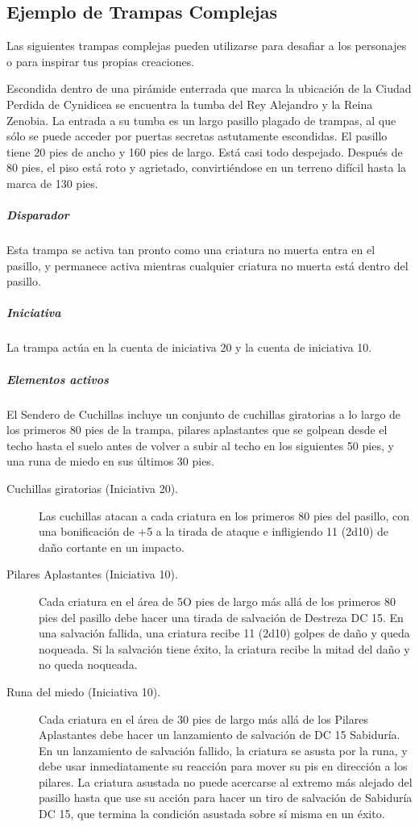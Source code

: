 \documentclass[a4paper,twocolumn,openany,10pt]{dndbook}
\begin{document}
\subsection*{Ejemplo de Trampas Complejas}
Las siguientes trampas complejas pueden utilizarse para desafiar a los personajes o para inspirar
tus propias creaciones. 

Escondida dentro de una pirámide enterrada que marca la ubicación de la Ciudad Perdida de Cynidicea se encuentra la tumba del Rey
Alejandro y la Reina Zenobia. La entrada a su tumba es un largo pasillo plagado de trampas, al que sólo se puede acceder por
puertas secretas astutamente escondidas. El pasillo tiene 20 pies de ancho y 160 pies de largo. Está casi todo despejado. Después
de 80 pies, el piso está roto y agrietado, convirtiéndose en un terreno difícil hasta la marca de 130 pies.

\subparagraph{Disparador} Esta trampa se activa tan pronto como una criatura no muerta entra en el pasillo, y permanece activa
mientras cualquier criatura no muerta está dentro del pasillo.

\subparagraph{Iniciativa} La trampa actúa en la cuenta de iniciativa 20 y la cuenta de iniciativa 10.

\subparagraph{Elementos activos} El Sendero de Cuchillas incluye un conjunto de cuchillas giratorias a lo largo de los primeros
80 pies de la trampa, pilares aplastantes que se golpean desde el techo hasta el suelo antes de volver a subir al techo en los
siguientes 50 pies, y una runa de miedo en sus últimos 30 pies. 

\begin{description}
	\item[Cuchillas giratorias (Iniciativa 20).] Las cuchillas atacan a cada criatura en los primeros 80 pies del pasillo, con
	una bonificación de +5 a la tirada de ataque e infligiendo 11 (2d10) de daño cortante en un impacto.
	
	\item[Pilares Aplastantes (Iniciativa 10).] Cada criatura en el área de 5O pies de largo más allá de los primeros 80 pies del
	pasillo debe hacer una tirada de salvación de Destreza DC 15. En una salvación fallida, una criatura recibe 11 (2d10) golpes
	de daño y queda noqueada. Si la salvación tiene éxito, la criatura recibe la mitad del daño y no queda noqueada.
	
	\item[Runa del miedo (Iniciativa 10).] Cada criatura en el área de 30 pies de largo más allá de los Pilares Aplastantes debe
	hacer un lanzamiento de salvación de DC 15 Sabiduría. En un lanzamiento de salvación fallido, la criatura se asusta por la
	runa, y debe usar inmediatamente su reacción para mover su pis en dirección a los pilares. La criatura asustada no puede
	acercarse al extremo más alejado del pasillo hasta que use su acción para hacer un tiro de salvación de Sabiduría DC 15, que
	termina la condición asustada sobre sí misma en un éxito. 
\end{description}
\end{document}
